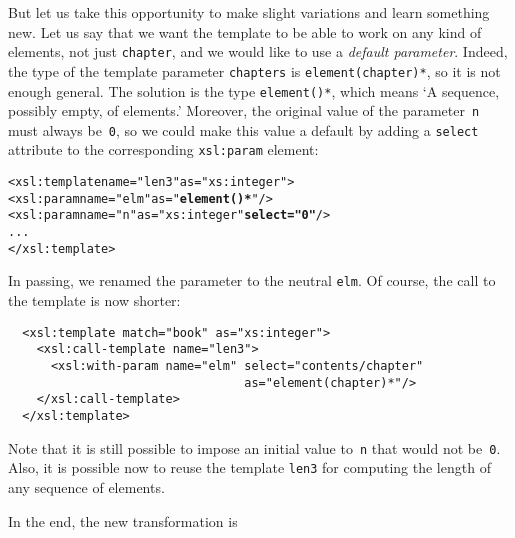 But let us take this opportunity to make slight variations and learn
something new. Let us say that we want the template to be able to work
on any kind of elements, not just \texttt{chapter}, and we would like
to use a \emph{default parameter}. Indeed, the type of the template
parameter \texttt{chapters} is \texttt{element(chapter)*}, so it is
not enough general. The solution is the type \texttt{element()*},
which means `A sequence, possibly empty, of elements.' Moreover, the
original value of the parameter~\texttt{n} must always be~\texttt{0},
so we could make this value a default by adding a \texttt{select}
attribute to the corresponding \texttt{xsl:param} element:
\begin{alltt}
  <xsl:template name="len3" as="xs:integer">
    <xsl:param name="elm" as="\textbf{element()*}"/>
    <xsl:param name="n" as="xs:integer" \textbf{select="0"}/>
    ...
  </xsl:template>
\end{alltt}
In passing, we renamed the parameter to the neutral \texttt{elm}. Of
course, the call to the template is now shorter:
\begin{verbatim}
  <xsl:template match="book" as="xs:integer">
    <xsl:call-template name="len3">
      <xsl:with-param name="elm" select="contents/chapter"
                                 as="element(chapter)*"/>
    </xsl:call-template>
  </xsl:template>
\end{verbatim}
Note that it is still possible to impose an initial value
to~\texttt{n} that would not be~\texttt{0}. Also, it is possible now
to reuse the template \texttt{len3} for computing the length of any
sequence of elements.

In the end, the new transformation is


